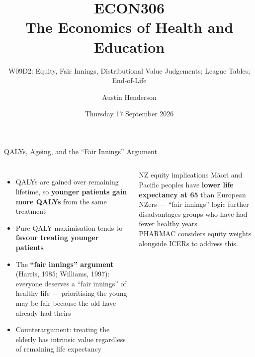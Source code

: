 \documentclass[aspectratio=169, 12pt]{beamer}
\title[ECON306: W09D2 — Equity and Fair Innings]{ECON306\\The Economics of Health and Education}
\subtitle{W09D2: Equity, Fair Innings, Distributional Value Judgements; League Tables; End-of-Life}
\author{Austin Henderson}
\institute{Department of Economics\\University of Otago}
\date{Thursday 17 September 2026}
\begin{document}
\begin{frame}[plain]
  \titlepage
\end{frame}



\begin{frame}{QALYs, Ageing, and the ``Fair Innings'' Argument}
  \begin{columns}
      \footnotesize
      \begin{itemize}
        \item QALYs are gained over remaining lifetime, so \textbf{younger patients gain more QALYs} from the same treatment
        \item Pure QALY maximisation tends to \textbf{favour treating younger patients}
        \item The \textbf{``fair innings'' argument} (Harris, 1985; Williams, 1997): everyone deserves a ``fair innings'' of healthy life --- prioritising the young may be fair because the old have already had theirs
        \item Counterargument: treating the elderly has intrinsic value regardless of remaining life expectancy
      \end{itemize}
      \begin{alertblock}{NZ equity implications}
        \footnotesize M\=aori and Pacific peoples have \textbf{lower life expectancy at 65} than European NZers --- ``fair innings'' logic further disadvantages groups who have had fewer healthy years.\\[0.15em]
        PHARMAC considers equity weights alongside ICERs to address this.
      \end{alertblock}
  \end{columns}
\end{frame}
\end{document}
